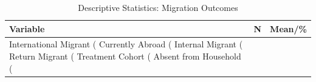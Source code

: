\begin{table}[!h]
\centering
\caption{\label{tab:tab:migration_summary}Descriptive Statistics: Migration Outcomes}
\centering
\fontsize{10}{12}\selectfont
\begin{tabular}[t]{lrr}
\toprule
Variable & N & Mean/\%\\
\midrule
International Migrant (%
Currently Abroad (%
Internal Migrant (%
Return Migrant (%
Treatment Cohort (%
\addlinespace
Absent from Household (%
\bottomrule
\end{tabular}
\end{table}
